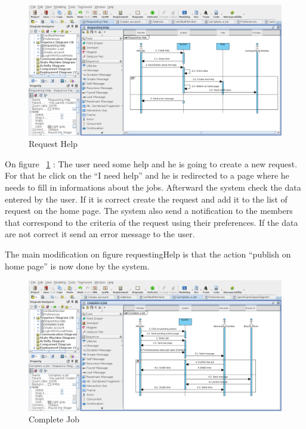 \documentclass[11pt, a4paper]{article}   	%
\begin{document}
\begin{figure}[!ht]
   \includegraphics[width=\textwidth]{requestHelp.png}
   \caption{\label{requestHelp} Request Help}
\end{figure}

On figure ~\ref{requestHelp} : The user need some help and he is going to create a new request. For that he click on the \enquote{I need help}
and he is redirected to a page where he needs to fill in informations about the jobs. Afterward the system check the data entered by the user.
If it is correct create the request and add it to the list of request on the home page. The system also send a notification to the members that
correspond to the criteria of the request using their preferences. If the data are not correct it send an error message to the user.

The main modification on figure {requestingHelp} is that the action \enquote{publish on home page} is now done by the system. 

\begin{figure}[!ht]
   \includegraphics[width=\textwidth]{completeJob.png}
   \caption{\label{completeJob} Complete Job}
\end{figure}
\end{document}
